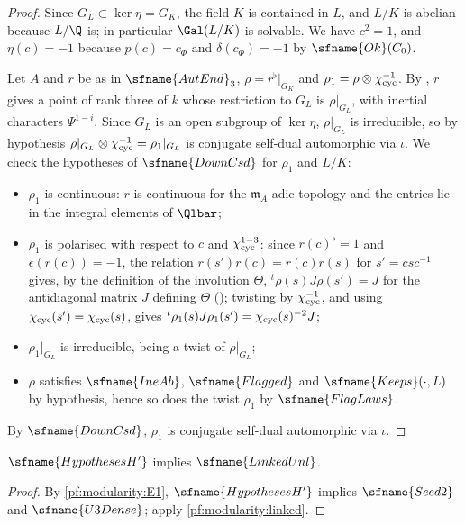\begin{proof}
Since $G_L\subset\ker\eta=G_K$, the field $K$ is contained in $L$, and $L/K$ is abelian because $L/\Q$ is; in particular
$\Gal(L/K)$ is solvable. We have $c^2=1$, and $\eta(c)=-1$ because $p(c)=c_\Phi$ and $\delta(c_\Phi)=-1$ by
$\sfname{Ok}(C_0)$.

Let $A$ and $r$ be as in $\sfname{AutEnd}_3$, $\rho=r^\flat|_{G_K}$ and $\rho_1=\rho\otimes\chi_{\mathrm{cyc}}^{-1}$. By
, $r$ gives a point of rank three of $k$ whose restriction to $G_L$ is
$\rho|_{G_L}$, with inertial characters $\Psi^{1-i}$. Since $G_L$ is an open subgroup of $\ker\eta$, $\rho|_{G_L}$ is
irreducible, so by hypothesis $\rho|_{G_L}\otimes\chi_{\mathrm{cyc}}^{-1}=\rho_1|_{G_L}$ is conjugate self-dual automorphic
via $\iota$. We check the hypotheses of $\sfname{DownCsd}$ for $\rho_1$ and $L/K$:
\begin{itemize}
\item $\rho_1$ is continuous: $r$ is continuous for the $\mathfrak m_A$-adic topology and the entries lie in the integral
elements of $\Qlbar$;
\item $\rho_1$ is polarised with respect to $c$ and $\chi_{\mathrm{cyc}}^{1-3}$: since $r(c)^\flat=1$ and $\epsilon(r(c))=-1$,
the relation $r(s')r(c)=r(c)r(s)$ for $s'=csc^{-1}$ gives, by the definition of the involution $\Theta$,
${}^t\rho(s)J\rho(s')=J$ for the antidiagonal matrix $J$ defining $\Theta$
(); twisting by $\chi_{\mathrm{cyc}}^{-1}$, and using
$\chi_{\mathrm{cyc}}(s')=\chi_{\mathrm{cyc}}(s)$, gives ${}^t\rho_1(s)J\rho_1(s')=\chi_{\mathrm{cyc}}(s)^{-2}J$;
\item $\rho_1|_{G_L}$ is irreducible, being a twist of $\rho|_{G_L}$;
\item $\rho$ satisfies $\sfname{IneAb}$, $\sfname{Flagged}$ and $\sfname{Keeps}(\cdot,L)$ by hypothesis, hence so does
the twist $\rho_1$ by $\sfname{FlagLaws}$.
\end{itemize}
By $\sfname{DownCsd}$, $\rho_1$ is conjugate self-dual automorphic via $\iota$.
\end{proof}

\begin{corollary}\label{pf:modularity:linkedH}
$\sfname{HypothesesH'}$ implies $\sfname{LinkedUnl}$.
\end{corollary}

\begin{proof}
By \ref{pf:modularity:E1}, $\sfname{HypothesesH'}$ implies $\sfname{Seed2}$ and $\sfname{U3Dense}$; apply
\cref{pf:modularity:linked}.
\end{proof}

